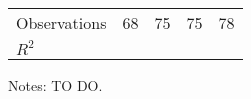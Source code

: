 \begin{table}[h]
{\begin{threeparttable}
\begin{tabular}{l*{4}{D{.}{.}{-1}}}
			Observations        &          68         &          75         &          75         &          78         \\
			$R^2$ & & & & \\
			\hline \hline
		\end{tabular}
		\begin{tablenotes}
			\footnotesize{Notes: TO DO.}
		\end{tablenotes}
	\end{threeparttable}
	}
\end{table}